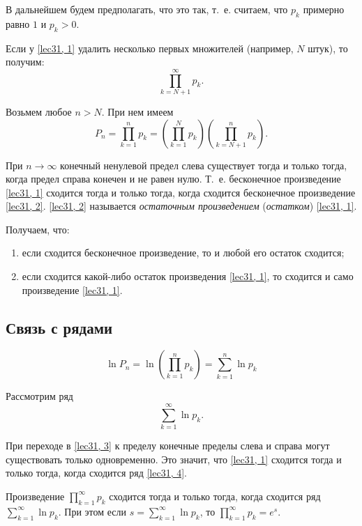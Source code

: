 \documentclass[../../main.tex]{subfiles}
\begin{document}
	В дальнейшем будем предполагать, что это так, т.~е. считаем, что $p_k$ примерно равно 
	$1$ и $p_k > 0$.
		
	Если у \eqref{lec31, 1} удалить несколько первых множителей (например, $N$ штук), то 
	получим:
	\begin{equation} \label{lec31, 2}
	\prod\limits_{k = N + 1}^{\infty} p_k.
	\end{equation}
		
	Возьмем любое $n > N$. При нем имеем \[P_n = \prod\limits_{k = 1}^{n} p_k = 
	\left(\prod\limits_{k = 1}^{N} p_k\right)\left(\prod\limits_{k = N + 
	1}^{n} p_k\right).\]
		
	При $n \to \infty$ конечный ненулевой предел слева существует тогда и только 
	тогда, когда предел справа конечен и не равен нулю. Т.~е. бесконечное 
	произведение \eqref{lec31, 1} сходится тогда и только тогда, когда сходится 
	бесконечное произведение \eqref{lec31, 2}. \eqref{lec31, 2} называется 
	\emph{остаточным произведением} (\emph{остатком}) \eqref{lec31, 1}.
		
	Получаем, что: 
	\begin{enumerate}[label={\alph*)}]
		\item если сходится бесконечное произведение, то и любой его остаток сходится;
		\item если сходится какой-либо остаток произведения \eqref{lec31, 1}, то 
		сходится и само произведение \eqref{lec31, 1}.
		\end{enumerate}
	
	\subsection{Связь с рядами}
	
	\begin{equation}\label{lec31, 3}
	 \ln P_n = \ln \left(\prod\limits_{k = 1}^{n} p_k\right) = \sum\limits_{k = 1}^{n} \ln p_k
	\end{equation}
	
	Рассмотрим ряд
	\begin{equation}\label{lec31, 4}
	\sum\limits_{k = 1}^{\infty} \ln p_k.
	\end{equation}
	
	При переходе в \eqref{lec31, 3} к пределу конечные пределы слева и справа 
	могут существовать только одновременно. Это значит, что \eqref{lec31, 1} 
	сходится тогда и только тогда, когда сходится ряд \eqref{lec31, 4}.
	
	\begin{thm}\label{lec31:thm1} 
		Произведение $\prod\limits_{k = 1}^{\infty} p_k$ сходится тогда и только 
		тогда, когда сходится ряд $\sum\limits_{k = 1}^{\infty} \ln p_k$. При этом 
		если $s = \sum\limits_{k = 1}^{\infty} \ln p_k$, то $\prod\limits_{k = 
		1}^{\infty} p_k = e^s$.
	\end{thm}
\end{document}
